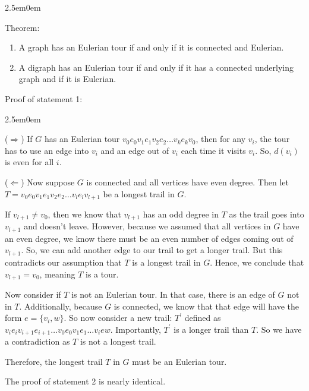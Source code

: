 \documentclass{book}
\newcommand{\hTwo}{%
   \color{MidnightBlue}%
   \fontsize{13}{15}\selectfont%
}
\newcommand{\hThree}{%
   \color{PineGreen}
   \fontsize{13}{15}\selectfont%
}
\newenvironment{myIndent}{%
   \begin{adjustwidth}{2.5em}{0em}%
}{%
   \end{adjustwidth}%
}
\newcommand{\uuline}[2][.]{%
{\vphantom{a}\color{#1}%
\rlap{\rule[-0.18em]{\widthof{#2}}{0.06em}}%
\rlap{\rule[-0.32em]{\widthof{#2}}{0.06em}}}%
#2}
\newcommand{\retTwo}{\hfill\bigbreak}
\begin{document}
{\begin{myIndent} \hTwo
   \uuline{Theorem}: 
   \begin{enumerate}
      \item A graph has an Eulerian tour if and only if it is connected and Eulerian.
      \item A digraph has an Eulerian tour if and only if it has a connected underlying graph and if it is Eulerian. \retTwo
   \end{enumerate}

   \hThree
   Proof of statement 1:
   \begin{myIndent}
      ($\Longrightarrow$) If $G$ has an Eulerian tour $v_0 e_0 v_1 e_1 v_2 e_2 \ldots v_k e_k v_0$, then for any $v_i$, the tour has to use an edge into $v_i$ and an edge out of $v_i$ each time it visits $v_i$. So, $d(v_i)$ is even for all $i$. \retTwo

      ($\Longleftarrow$) Now suppose $G$ is connected and all vertices have even degree. Then let $T=v_0 e_0 v_1 e_1 v_2 e_2 \ldots v_l e_l v_{l+1}$ be a longest trail in $G$. \retTwo
      
      If $v_{l+1} \neq v_0$, then we know that $v_{l+1}$ has an odd degree in $T$ as the trail goes into $v_{l+1}$ and doesn't leave. However, because we assumed that all vertices in $G$ have an even degree, we know there must be an even number of edges coming out of $v_{l+1}$. So, we can add another edge to our trail to get a longer trail. But this contradicts our assumption that $T$ is a longest trail in $G$. Hence, we conclude that $v_{l+1} = v_0$, meaning $T$ is a tour.\retTwo
      
      Now consider if $T$ is not an Eulerian tour. In that case, there is an edge of $G$ not in $T$. Additionally, because $G$ is connected, we know that that edge will have the form $e = \{v_i, w\}$. So now consider a new trail: $T^\prime$ defined as $v_i e_i v_{i+1} e_{i+1} \ldots v_0 e_0 v_1 e_1 \ldots v_i e w$. Importantly, $T^\prime$ is a longer trail than $T$. So we have a contradiction as $T$ is not a longest trail. \retTwo

      Therefore, the longest trail $T$ in $G$ must be an Eulerian tour. \retTwo
   \end{myIndent}

   The proof of statement 2 is nearly identical. \retTwo
   

\end{myIndent}}
\end{document}
